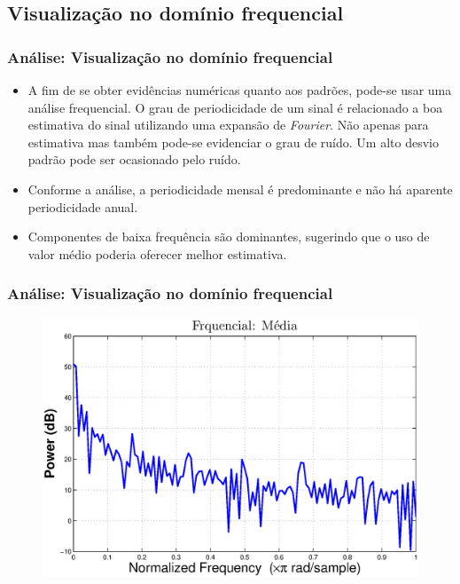 \documentclass[xcolor=dvipsnames,xcolor=table]{beamer}
\begin{document}
\subsection{Visualização no domínio frequencial}
\begin{frame}\frametitle{Análise: Visualização no domínio frequencial}

\begin{itemize}
\item A fim de se obter evidências numéricas quanto aos padrões, pode-se usar uma análise frequencial. O grau de periodicidade de um sinal é relacionado a boa estimativa do sinal utilizando uma expansão de \emph{Fourier}. Não apenas para estimativa mas também pode-se evidenciar o grau de ruído. Um alto desvio padrão pode ser ocasionado pelo ruído.

\item Conforme a análise, a periodicidade mensal é predominante e não há aparente periodicidade anual.

\item Componentes de baixa frequência são dominantes, sugerindo que o uso de valor médio poderia oferecer melhor estimativa.

\end{itemize}

\end{frame}

\begin{frame}\frametitle{Análise: Visualização no domínio frequencial}
\begin{figure}[htpb] \begin{center} 
\includegraphics[width=0.9\columnwidth]{fq1}
\end{center}
\end{figure}
\end{frame}
\end{document}
